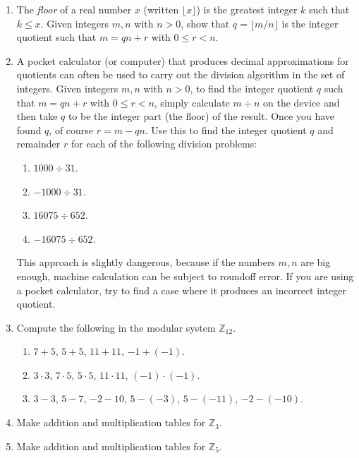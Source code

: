 \documentclass[11pt]{article}
\newenvironment{problems}
{
 \begin{enumerate}[topsep=1pt,itemsep=0pt,parsep=2pt,leftmargin=0.6cm,%
 label={\arabic*.}, ref=\arabic*] \small
}
{
 \end{enumerate}
}
\theoremstyle{definition}
\newcommand{\Z}{\mathbb{Z}} %
\begin{document}
\begin{problems}

\item The \emph{floor} of a real number $x$ (written $\lfloor x
  \rfloor$) is the greatest integer $k$ such that $k \le x$.  Given
  integers $m,n$ with $n > 0$, show that $q = \lfloor m/n \rfloor$ is
  the integer quotient such that $m = qn+r$ with $0 \le r < n$.


\item A pocket calculator (or computer) that produces decimal
  approximations for quotients can often be used to carry out the
  division algorithm in the set of integers. Given integers $m,n$ with
  $n > 0$, to find the integer quotient $q$ such that $m = qn+r$ with
  $0 \le r < n$, simply calculate $m \div n$ on the device and then
  take $q$ to be the integer part (the floor) of the result. Once you
  have found $q$, of course $r = m - qn$. Use this to find the integer
  quotient $q$ and remainder $r$ for each of the following division
  problems:
  \begin{multicols}{2}
  \begin{enumerate}[topsep=0pt,parsep=0pt]
  \item $1000 \div 31$.
  \item $-1000 \div 31$.
  \item $16075 \div 652$.
  \item $-16075 \div 652$.
  \end{enumerate}
  \end{multicols}
  This approach is slightly dangerous, because if the numbers $m,n$
  are big enough, machine calculation can be subject to roundoff
  error. If you are using a pocket calculator, try to find a case
  where it produces an incorrect integer quotient.

\item Compute the following in the modular system $\Z_{12}$.
  \begin{enumerate}
  \item $7+5$, $5+5$, $11+11$, $-1 + (-1)$.
  \item $3 \cdot 3$, $7 \cdot 5$, $5 \cdot 5$, $11 \cdot 11$, $(-1)
    \cdot (-1)$.
  \item $3-3$, $5-7$, $-2-10$, $5-(-3)$, $5-(-11)$,
    $-2-(-10)$.
  \end{enumerate}

\item Make addition and multiplication tables for $\Z_3$.

\item Make addition and multiplication tables for $\Z_5$.


\end{problems}
\end{document}
